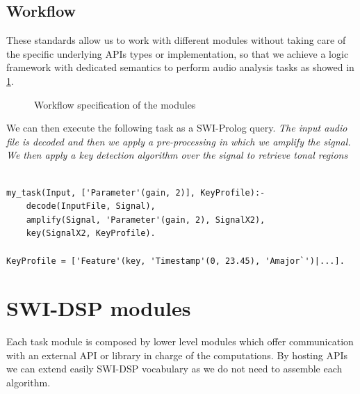 \documentclass{llncs}
\begin{document}
\subsection{Workflow}

These standards allow us to work with different modules without taking care of the specific underlying APIs types or implementation, so that we achieve a logic framework with dedicated semantics to perform audio analysis tasks as showed in \ref{fig:workflow}.

\begin{figure}
\centerline{}
\caption{Workflow specification of the modules}
\label{fig:workflow}
\end{figure}

We can then execute the following task as a SWI-Prolog query. \textit{The input audio file is decoded and then we apply a pre-processing in which we amplify the signal. We then apply a key detection algorithm over the signal to retrieve tonal regions}

\begin{verbatim}
 
my_task(Input, ['Parameter'(gain, 2)], KeyProfile):-
	decode(InputFile, Signal),
	amplify(Signal, 'Parameter'(gain, 2), SignalX2),
	key(SignalX2, KeyProfile).

KeyProfile = ['Feature'(key, 'Timestamp'(0, 23.45), 'Amajor`')|...].	

\end{verbatim}

\section{SWI-DSP modules}

Each task module is composed by lower level modules which offer communication with an external API or library in charge of the computations. By hosting APIs we can extend easily SWI-DSP vocabulary as we do not need to assemble each algorithm.
\end{document}
